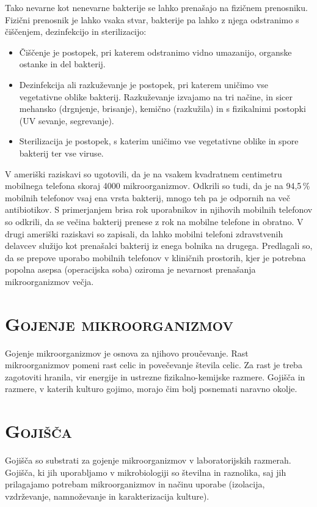 \documentclass[12pt, a4paper, oneside]{report}
\begin{document}
Tako nevarne kot nenevarne bakterije se lahko prenašajo na fizičnem prenosniku. Fizični prenosnik je lahko vsaka stvar, bakterije pa lahko z njega odstranimo s čiščenjem, dezinfekcijo in sterilizacijo:
\begin{itemize}
\item Čiščenje je postopek, pri katerem odstranimo vidno umazanijo, organske ostanke in del bakterij.
\item Dezinfekcija ali razkuževanje je postopek, pri katerem uničimo vse vegetativne oblike bakterij. Razkuževanje izvajamo na tri načine, in sicer mehansko (drgnjenje, brisanje), kemično (razkužila) in s fizikalnimi postopki (UV sevanje, segrevanje).
\item Sterilizacija je postopek, s katerim uničimo vse vegetativne oblike in spore bakterij ter vse viruse.
\end{itemize}

V ameriški raziskavi so ugotovili, da je na vsakem kvadratnem centimetru mobilnega telefona skoraj 4000 mikroorganizmov. Odkrili so tudi, da je na 94,5\,\% mobilnih telefonov vsaj ena vrsta bakterij, mnogo teh pa je odpornih na več antibiotikov. S primerjanjem brisa rok uporabnikov in njihovih mobilnih telefonov so odkrili, da se večina bakterij prenese z rok na mobilne telefone in obratno. V drugi ameriški raziskavi so zapisali, da lahko mobilni telefoni zdravstvenih delavcev služijo kot prenašalci bakterij iz enega bolnika na drugega. Predlagali so, da se prepove uporabo mobilnih telefonov v kliničnih prostorih, kjer je potrebna popolna asepsa (operacijska soba) oziroma je nevarnost prenašanja mikroorganizmov večja.

\section{\textsc{Gojenje mikroorganizmov}}

Gojenje mikroorganizmov je osnova za njihovo proučevanje. Rast mikroorganizmov pomeni rast celic in povečevanje števila celic. Za rast je treba zagotoviti hranila, vir energije in ustrezne fizikalno-kemijske razmere. Gojišča in razmere, v katerih kulturo gojimo, morajo čim bolj posnemati naravno okolje.

\section{\textsc{Gojišča}}

Gojišča so substrati za gojenje mikroorganizmov v laboratorijskih razmerah. Gojišča, ki jih uporabljamo v mikrobiologiji so številna in raznolika, saj jih prilagajamo potrebam mikroorganizmov in načinu uporabe (izolacija, vzdrževanje, namnoževanje in karakterizacija kulture).
\end{document}
